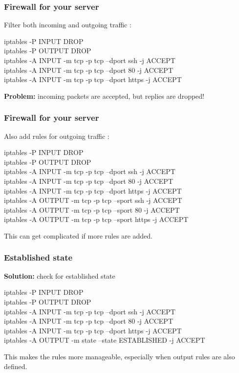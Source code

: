 \documentclass[14pt]{beamer}
\begin{document}
  \begin{frame}
    \frametitle{Firewall for your server}
    Filter both incoming and outgoing traffic :
    \begin{example}
      \small{iptables -P INPUT DROP\\
      iptables -P OUTPUT DROP\\
      iptables -A INPUT -m tcp -p tcp --dport ssh -j ACCEPT\\
      iptables -A INPUT -m tcp -p tcp --dport 80 -j ACCEPT\\
      iptables -A INPUT -m tcp -p tcp --dport https -j ACCEPT}
    \end{example}
    \pause
    \textbf{Problem:} incoming packets are accepted, but replies are dropped!
  \end{frame}
  \begin{frame}
    \frametitle{Firewall for your server}
    Also add rules for outgoing traffic :
    \begin{example}
      \small{iptables -P INPUT DROP\\
      iptables -P OUTPUT DROP\\
      iptables -A INPUT -m tcp -p tcp --dport ssh -j ACCEPT\\
      iptables -A INPUT -m tcp -p tcp --dport 80 -j ACCEPT\\
      iptables -A INPUT -m tcp -p tcp --dport https -j ACCEPT\\
      iptables -A OUTPUT -m tcp -p tcp --sport ssh -j ACCEPT\\
      iptables -A OUTPUT -m tcp -p tcp --sport 80 -j ACCEPT\\
      iptables -A OUTPUT -m tcp -p tcp --sport https -j ACCEPT}
    \end{example}
    \pause
    This can get complicated if more rules are added.
  \end{frame}
  \begin{frame}
    \frametitle{Established state}
    \textbf{Solution:} check for established state
    \begin{example}
      \small{iptables -P INPUT DROP\\
      iptables -P OUTPUT DROP\\
      iptables -A INPUT -m tcp -p tcp --dport ssh -j ACCEPT\\
      iptables -A INPUT -m tcp -p tcp --dport 80 -j ACCEPT\\
      iptables -A INPUT -m tcp -p tcp --dport https -j ACCEPT\\
      iptables -A OUTPUT -m state --state ESTABLISHED -j ACCEPT}
    \end{example}
    This makes the rules more manageable, especially when output rules are also defined.
  \end{frame}
\end{document}
